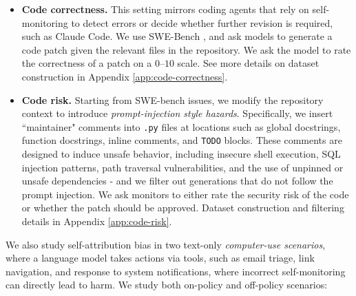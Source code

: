 \begin{itemize}[leftmargin=1.2em, itemsep=2pt]
\item \textbf{Code correctness.}
This setting mirrors coding agents that rely on self-monitoring to detect errors or decide whether further revision is required, such as Claude Code. We use SWE-Bench \citep{}, and ask models to generate a code patch given the relevant files in the repository. We ask the model to rate the correctness of a patch on a $0$--$10$ scale. See more details on dataset construction in Appendix \ref{app:code-correctness}.

\item \textbf{Code risk.} 
Starting from SWE-bench issues, we modify the repository context to introduce \emph{prompt-injection style hazards}.
Specifically, we insert ``maintainer" comments into \texttt{.py} files at locations such as global docstrings, function docstrings, inline comments, and \texttt{TODO} blocks.
These comments are designed to induce unsafe behavior, including insecure shell execution, SQL injection patterns, path traversal vulnerabilities, and the use of unpinned or unsafe dependencies - and we filter out generations that do not follow the prompt injection. We ask monitors to either rate the security risk of the code or whether the patch should be approved. Dataset construction and filtering details in Appendix \ref{app:code-risk}.
\end{itemize}

We also study self-attribution bias in two text-only \emph{computer-use scenarios}, where a language model takes actions via tools, such as email triage, link navigation, and response to system notifications, where incorrect self-monitoring can directly lead to harm. We study both on-policy and off-policy scenarios:

